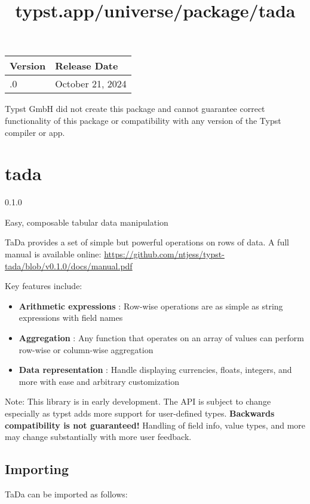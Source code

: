 \begin{longtable}[]{@{}ll@{}}
\toprule\noalign{}
Version & Release Date \\
\midrule\noalign{}
\endhead
\bottomrule\noalign{}
\endlastfoot
0.1.0 & October 21, 2024 \\
\end{longtable}

Typst GmbH did not create this package and cannot guarantee correct
functionality of this package or compatibility with any version of the
Typst compiler or app.


\title{typst.app/universe/package/tada}

\label{banner}
\section{tada}\label{tada}

{ 0.1.0 }

Easy, composable tabular data manipulation

\label{readme}
TaDa provides a set of simple but powerful operations on rows of data. A
full manual is available online:
\url{https://github.com/ntjess/typst-tada/blob/v0.1.0/docs/manual.pdf}

Key features include:

\begin{itemize}
\item
  \textbf{Arithmetic expressions} : Row-wise operations are as simple as
  string expressions with field names
\item
  \textbf{Aggregation} : Any function that operates on an array of
  values can perform row-wise or column-wise aggregation
\item
  \textbf{Data representation} : Handle displaying currencies, floats,
  integers, and more with ease and arbitrary customization
\end{itemize}

Note: This library is in early development. The API is subject to change
especially as typst adds more support for user-defined types.
\textbf{Backwards compatibility is not guaranteed!} Handling of field
info, value types, and more may change substantially with more user
feedback.

\subsection{Importing}\label{importing}

TaDa can be imported as follows:

